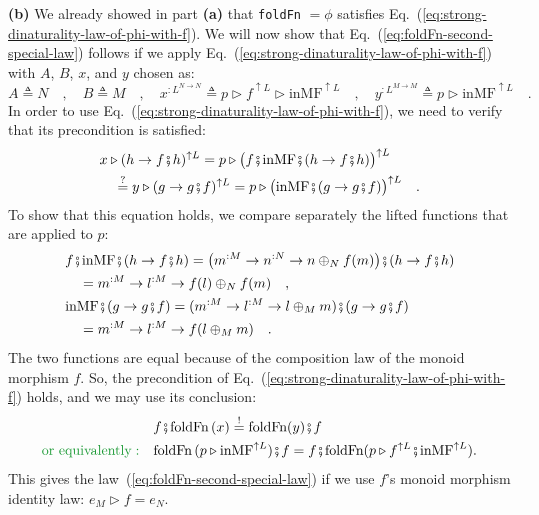 \textbf{(b)} We already showed in part \textbf{(a)} that \lstinline!foldFn!
$=\phi$ satisfies Eq.~(\ref{eq:strong-dinaturality-law-of-phi-with-f}).
We will now show that Eq.~(\ref{eq:foldFn-second-special-law}) follows
if we apply Eq.~(\ref{eq:strong-dinaturality-law-of-phi-with-f})
with $A$, $B$, $x$, and $y$ chosen as:
\[
A\triangleq N\quad,\quad B\triangleq M\quad,\quad x^{:L^{N\rightarrow N}}\triangleq p\triangleright f^{\uparrow L}\triangleright\text{inMF}^{\uparrow L}\quad,\quad y^{:L^{M\rightarrow M}}\triangleq p\triangleright\text{inMF}^{\uparrow L}\quad.
\]
In order to use Eq.~(\ref{eq:strong-dinaturality-law-of-phi-with-f}),
we need to verify that its precondition is satisfied:
\begin{align*}
 & x\triangleright(h\rightarrow f\bef h)^{\uparrow L}=p\triangleright\big(f\bef\text{inMF}\bef(h\rightarrow f\bef h)\big)^{\uparrow L}\\
 & \quad\overset{?}{=}y\triangleright(g\rightarrow g\bef f)^{\uparrow L}=p\triangleright\big(\text{inMF}\bef(g\rightarrow g\bef f)\big)^{\uparrow L}\quad.
\end{align*}
To show that this equation holds, we compare separately the lifted
functions that are applied to $p$:
\begin{align*}
 & f\bef\text{inMF}\bef(h\rightarrow f\bef h)=\big(m^{:M}\rightarrow n^{:N}\rightarrow n\oplus_{N}f(m)\big)\bef(h\rightarrow f\bef h)\\
 & \quad=m^{:M}\rightarrow l^{:M}\rightarrow f(l)\oplus_{N}f(m)\quad,\\
 & \text{inMF}\bef(g\rightarrow g\bef f)=(m^{:M}\rightarrow l^{:M}\rightarrow l\oplus_{M}m)\bef(g\rightarrow g\bef f)\\
 & \quad=m^{:M}\rightarrow l^{:M}\rightarrow f(l\oplus_{M}m)\quad.
\end{align*}
The two functions are equal because of the composition law of the
monoid morphism $f$. So, the precondition of Eq.~(\ref{eq:strong-dinaturality-law-of-phi-with-f})
holds, and we may use its conclusion:
\begin{align*}
 & f\bef\text{foldFn}\,(x)\overset{!}{=}\text{foldFn}(y)\bef f\\
{\color{greenunder}\text{or equivalently}:}\quad & \text{foldFn}\,(p\triangleright\text{inMF}^{\uparrow L})\bef f=f\bef\text{foldFn}(p\triangleright f^{\uparrow L}\bef\text{inMF}^{\uparrow L}).
\end{align*}
This gives the law~(\ref{eq:foldFn-second-special-law}) if we use
$f$\textsf{'}s monoid morphism identity law: $e_{M}\triangleright f=e_{N}$.

